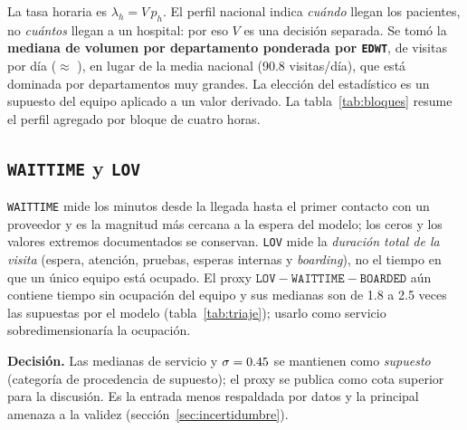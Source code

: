 La tasa horaria es $\lambda_h=V\,p_h$. El perfil nacional indica \emph{cuándo} llegan los
pacientes, no \emph{cuántos} llegan a un hospital: por eso $V$ es una decisión separada. Se
tomó la \textbf{mediana de volumen por departamento ponderada por \texttt{EDWT}}, de
\DailyVolume{} visitas por día ($\approx$ \DailyVolumeRound), en lugar de la media nacional
(90.8 visitas/día), que está dominada por departamentos muy grandes. La elección del
estadístico es un supuesto del equipo aplicado a un valor derivado. La tabla~\ref{tab:bloques}
resume el perfil agregado por bloque de cuatro horas.

\begin{table}[ht]
\centering\small
\caption{Llegadas por bloque en el departamento de referencia y capacidad de cada horario.}
\label{tab:bloques}
\end{table}

\begin{table}[ht]
\centering\small
\caption{Probabilidades de triaje derivadas de NHAMCS y medianas de servicio supuestas.
El proxy $\texttt{LOV}-\texttt{WAITTIME}-\texttt{BOARDED}$ es una cota superior, no el
servicio del modelo.}
\label{tab:triaje}
\end{table}

\subsection{\texttt{WAITTIME} y \texttt{LOV}}
\texttt{WAITTIME} mide los minutos desde la llegada hasta el primer contacto con un
proveedor y es la magnitud más cercana a la espera del modelo; los ceros y los valores
extremos documentados se conservan. \texttt{LOV} mide la \emph{duración total de la visita}
(espera, atención, pruebas, esperas internas y \emph{boarding}), no el tiempo en que un
único equipo está ocupado. El proxy $\texttt{LOV}-\texttt{WAITTIME}-\texttt{BOARDED}$ aún
contiene tiempo sin ocupación del equipo y sus medianas son de 1.8 a 2.5 veces las
supuestas por el modelo (tabla~\ref{tab:triaje}); usarlo como servicio sobredimensionaría
la ocupación.

\textbf{Decisión.} Las medianas de servicio y $\sigma=0.45$ se mantienen como
\emph{supuesto} (categoría de procedencia de supuesto); el proxy se publica como cota superior
para la discusión. Es la entrada menos respaldada por datos y la principal amenaza a la
validez (sección~\ref{sec:incertidumbre}).


